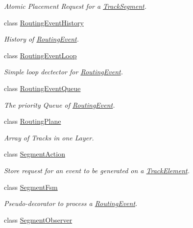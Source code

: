 \begin{DoxyCompactItemize}
\begin{DoxyCompactList}\small\item\em Atomic Placement Request for a \mbox{\hyperlink{classKite_1_1TrackSegment}{Track\+Segment}}. \end{DoxyCompactList}\item 
class \mbox{\hyperlink{classKite_1_1RoutingEventHistory}{Routing\+Event\+History}}
\begin{DoxyCompactList}\small\item\em History of \mbox{\hyperlink{classKite_1_1RoutingEvent}{Routing\+Event}}. \end{DoxyCompactList}\item 
class \mbox{\hyperlink{classKite_1_1RoutingEventLoop}{Routing\+Event\+Loop}}
\begin{DoxyCompactList}\small\item\em Simple loop dectector for \mbox{\hyperlink{classKite_1_1RoutingEvent}{Routing\+Event}}. \end{DoxyCompactList}\item 
class \mbox{\hyperlink{classKite_1_1RoutingEventQueue}{Routing\+Event\+Queue}}
\begin{DoxyCompactList}\small\item\em The priority Queue of \mbox{\hyperlink{classKite_1_1RoutingEvent}{Routing\+Event}}. \end{DoxyCompactList}\item 
class \mbox{\hyperlink{classKite_1_1RoutingPlane}{Routing\+Plane}}
\begin{DoxyCompactList}\small\item\em Array of Tracks in one Layer. \end{DoxyCompactList}\item 
class \mbox{\hyperlink{classKite_1_1SegmentAction}{Segment\+Action}}
\begin{DoxyCompactList}\small\item\em Store request for an event to be generated on a \mbox{\hyperlink{classKite_1_1TrackElement}{Track\+Element}}. \end{DoxyCompactList}\item 
class \mbox{\hyperlink{classKite_1_1SegmentFsm}{Segment\+Fsm}}
\begin{DoxyCompactList}\small\item\em Pseudo-\/decorator to process a \mbox{\hyperlink{classKite_1_1RoutingEvent}{Routing\+Event}}. \end{DoxyCompactList}\item 
class \mbox{\hyperlink{classKite_1_1SegmentObserver}{Segment\+Observer}}

\end{DoxyCompactItemize}
